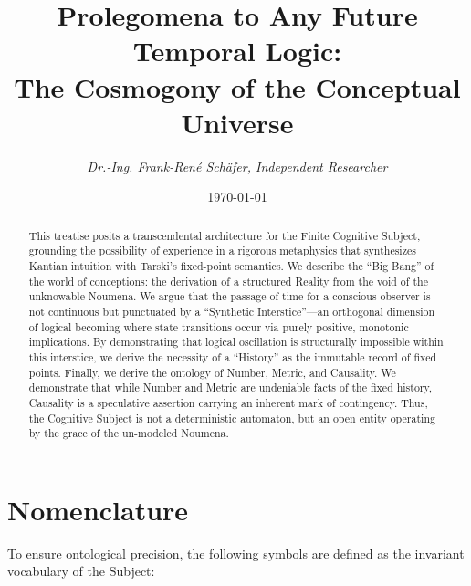 \documentclass[11pt, a4paper]{article}
\title{\textbf{Prolegomena to Any Future Temporal Logic}: \\ \large The Cosmogony of the Conceptual Universe}
\author{\textit{Dr.-Ing. Frank-René Schäfer, Independent Researcher}}
\date{\today}
\theoremstyle{formalism}
\begin{document}
\maketitle

\begin{abstract} 
This treatise posits a transcendental architecture for the Finite Cognitive Subject, grounding the possibility of experience in a rigorous metaphysics that synthesizes Kantian intuition with Tarski’s fixed-point semantics. We describe the ``Big Bang'' of the world of conceptions: the derivation of a structured Reality from the void of the unknowable Noumena. We argue that the passage of time for a conscious observer is not continuous but punctuated by a ``Synthetic Interstice''---an orthogonal dimension of logical becoming where state transitions occur via purely positive, monotonic implications. By demonstrating that logical oscillation is structurally impossible within this interstice, we derive the necessity of a ``History'' as the immutable record of fixed points. Finally, we derive the ontology of Number, Metric, and Causality. We demonstrate that while Number and Metric are undeniable facts of the fixed history, Causality is a speculative assertion carrying an inherent mark of contingency. Thus, the Cognitive Subject is not a deterministic automaton, but an open entity operating by the grace of the un-modeled Noumena.
\end{abstract}

\section*{Nomenclature}

To ensure ontological precision, the following symbols are defined as the
invariant vocabulary of the Subject:
\end{document}
